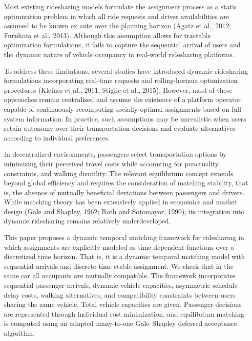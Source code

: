 \documentclass[11pt,a4paper]{article}
\begin{document}
Most existing ridesharing models formulate the assignment process as a static optimization problem in which all ride requests and driver availabilities are assumed to be known ex ante over the planning horizon (Agatz et al., 2012; Furuhata et al., 2013). Although this assumption allows for tractable optimization formulations, it fails to capture the sequential arrival of users and the dynamic nature of vehicle occupancy in real-world ridesharing platforms.

To address these limitations, several studies have introduced dynamic ridesharing formulations incorporating real-time requests and rolling-horizon optimization procedures (Kleiner et al., 2011; Stiglic et al., 2015). However, most of these approaches remain centralized and assume the existence of a platform operator capable of continuously recomputing socially optimal assignments based on full system information. In practice, such assumptions may be unrealistic when users retain autonomy over their transportation decisions and evaluate alternatives according to individual preferences.

In decentralized environments, passengers select transportation options by minimizing their perceived travel costs while accounting for punctuality constraints, and walking disutility. The relevant equilibrium concept extends beyond global efficiency and requires the consideration of matching stability, that is, the absence of mutually beneficial deviations between passengers and drivers. While matching theory has been extensively applied in economics and market design (Gale and Shapley, 1962; Roth and Sotomayor, 1990), its integration into dynamic ridesharing remains relatively underdeveloped.

This paper proposes a dynamic temporal matching framework for ridesharing in which assignments are explicitly modeled as time-dependent functions over a discretized time horizon. That is, it is a dynamic temporal matching model with sequential arrivals and discrete-time stable assignment. We check that in the same car all occupants are mutually compatible. The framework incorporates sequential passenger arrivals, dynamic vehicle capacities, asymmetric schedule delay costs, walking alternatives, and compatibility constraints between users sharing the same vehicle. Total vehicle capacities are given. Passenger decisions are represented through individual cost minimization, and equilibrium matching is computed using an adapted many-to-one Gale–Shapley deferred acceptance algorithm.
\end{document}
